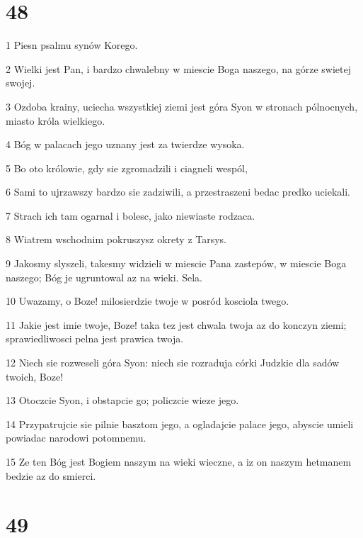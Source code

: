 \chapter{48}

\par 1 Piesn psalmu synów Korego.
\par 2 Wielki jest Pan, i bardzo chwalebny w miescie Boga naszego, na górze swietej swojej.
\par 3 Ozdoba krainy, uciecha wszystkiej ziemi jest góra Syon w stronach pólnocnych, miasto króla wielkiego.
\par 4 Bóg w palacach jego uznany jest za twierdze wysoka.
\par 5 Bo oto królowie, gdy sie zgromadzili i ciagneli wespól,
\par 6 Sami to ujrzawszy bardzo sie zadziwili, a przestraszeni bedac predko uciekali.
\par 7 Strach ich tam ogarnal i bolesc, jako niewiaste rodzaca.
\par 8 Wiatrem wschodnim pokruszysz okrety z Tarsys.
\par 9 Jakosmy slyszeli, takesmy widzieli w miescie Pana zastepów, w miescie Boga naszego; Bóg je ugruntowal az na wieki. Sela.
\par 10 Uwazamy, o Boze! milosierdzie twoje w posród kosciola twego.
\par 11 Jakie jest imie twoje, Boze! taka tez jest chwala twoja az do konczyn ziemi; sprawiedliwosci pelna jest prawica twoja.
\par 12 Niech sie rozweseli góra Syon: niech sie rozraduja córki Judzkie dla sadów twoich, Boze!
\par 13 Otoczcie Syon, i obstapcie go; policzcie wieze jego.
\par 14 Przypatrujcie sie pilnie basztom jego, a ogladajcie palace jego, abyscie umieli powiadac narodowi potomnemu.
\par 15 Ze ten Bóg jest Bogiem naszym na wieki wieczne, a iz on naszym hetmanem bedzie az do smierci.

\chapter{49}

